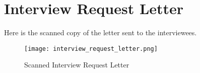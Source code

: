 %
%
%                 

\chapter{Interview Request Letter}
\label{sec:appendixc}


Here is the scanned copy of the letter sent to the interviewees.

\begin{figure}[h!]
  \centering
  \texttt{[image: interview\_request\_letter.png]}
  \caption{Scanned Interview Request Letter}
  \label{fig:interview_letter}
\end{figure}
